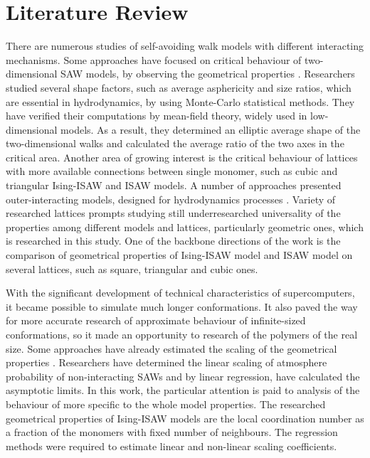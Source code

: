 \section{Literature Review}
\label{sec:lit}
There are numerous studies of self-avoiding walk models with different interacting mechanisms. 
Some approaches have focused on critical behaviour of two-dimensional SAW models, by observing the geometrical properties \cite{Caracciolo2011, owczarek2000first, arkin2013gyration}. 
Researchers studied several shape factors, such as average asphericity and size ratios, which are essential in hydrodynamics, by using Monte-Carlo statistical methods. 
They have verified their computations by mean-field theory, widely used in low-dimensional models. 
As a result, they determined an elliptic average shape of the two-dimensional walks and calculated the average ratio of the two axes in the critical area.
Another area of growing interest is the critical behaviour of lattices with more available connections between single monomer, such as cubic and triangular Ising-ISAW \cite{Foster2021} and ISAW \cite{Tesi1996, Privman1986} models. 
A number of approaches presented outer-interacting models, designed for hydrodynamics processes \cite{LivneSAW1988, madras1988pivot}. 
Variety of researched lattices prompts studying still underresearched universality of the properties among different models and lattices, particularly geometric ones, which is researched in this study. 
One of the backbone directions of the work is the comparison of geometrical properties of Ising-ISAW model and ISAW model on several lattices, such as square, triangular and cubic ones.

With the significant development of technical characteristics of supercomputers, it became possible to simulate much longer conformations. 
It also paved the way for more accurate research of approximate behaviour of infinite-sized conformations, so it made an opportunity to research of the polymers of the real size. 
Some approaches have already estimated the scaling of the geometrical properties \cite{owczarek2008scaling}. 
Researchers have determined the linear scaling of atmosphere probability of non-interacting SAWs and by linear regression, have calculated the asymptotic limits. 
In this work, the particular attention is paid to analysis of the behaviour of more specific to the whole model properties. 
The researched geometrical properties of Ising-ISAW models are the local coordination number as a fraction of the monomers with fixed number of neighbours. 
The regression methods were required to estimate linear and non-linear scaling coefficients.
